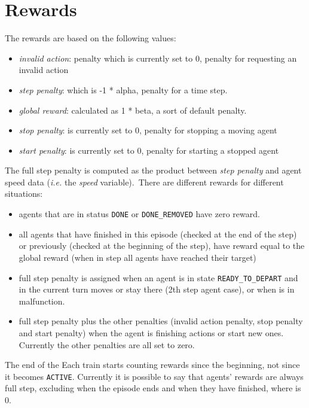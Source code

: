 \section{Rewards}
\label{sec:envRewards}
The rewards are based on the following values:
\begin{itemize}
\item \textit{invalid action}: penalty which is currently set to 0, penalty for requesting an invalid action
\item \textit{step penalty}: which is -1 * alpha, penalty for a time step.
\item \textit{global reward}: calculated as 1 * beta, a sort of default penalty.
\item \textit{stop penalty}: is currently set to 0, penalty for stopping a moving agent
\item \textit{start penalty}: is currently set to 0, penalty for starting a stopped agent
\end{itemize}
The full step penalty is computed as the product between \textit{step penalty} and agent speed data (\textit{i.e.} the \textit{speed} variable).\
There are different rewards for different situations:
\begin{itemize}
\item agents that are in status \texttt{DONE} or \texttt{DONE\_REMOVED} have zero reward.
\item all agents that have finished in this episode (checked at the end of the step) or previously (checked at the beginning of the step), have reward equal to the global reward (when in step all agents have reached their target)

\item full step penalty is assigned when an agent is in state \texttt{READY\_TO\_DEPART} and in the current turn moves or stay there (2th step agent case), or when is in malfunction.
\item full step penalty plus the other penalties (invalid action penalty, stop penalty and start penalty) when the agent is finishing actions or start new ones. Currently the other penalties are all set to zero.
\end{itemize}
The end of the Each train starts counting rewards since the beginning, not since it becomes \texttt{ACTIVE}. Currently it is possible to say that agents’ rewards are always full step, excluding when the episode ends and when they have finished, where is 0.

